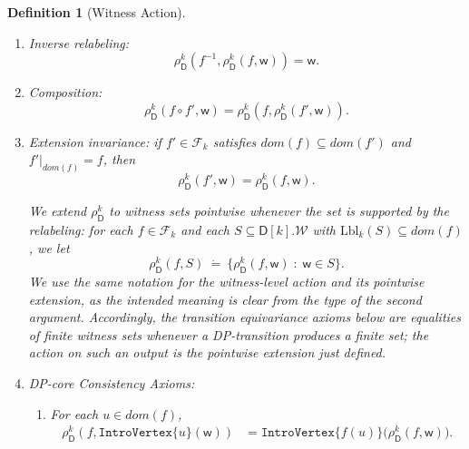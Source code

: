 \documentclass[11pt,a4paper]{article}
\newtheorem{definition}[theorem]{Definition}
\newcommand{\treewidthvalue}{k}
\newcommand{\introvertextype}[1]{\mathtt{IntroVertex}\{#1\}}
\newcommand{\defeq}{~\dot{=}~}
\newcommand{\vertexone}{u}
\newcommand{\allwitnesses}{\mathcal{W}}
\newcommand{\awitness}{\mathsf{w}}
\newcommand{\dpcore}{\mathsf{D}}
\newcommand{\witnessset}{S}
\newcommand{\domain}{dom}
\newcommand{\relabelingfunction}{f}
\newcommand{\relabelclass}{\mathcal{F}}
\newcommand{\action}{\rho}
\begin{document}
\begin{definition}[Witness Action]
\begin{enumerate}
\[	    \mathrm{Lbl}_{\treewidthvalue}(\action_{\dpcore}^{\treewidthvalue}(\relabelingfunction,\awitness))
	    = \relabelingfunction(\mathrm{Lbl}_{\treewidthvalue}(\awitness)).
	    \]
	    \item Inverse relabeling: \label{condition:relabeldpcore-condition-two} \[\action_{\dpcore}^{\treewidthvalue}(\relabelingfunction^{-1},\action_{\dpcore}^{\treewidthvalue}(\relabelingfunction,\awitness)) = \awitness.\]
	    \item Composition: \label{condition:relabeldpcore-condition-three} \[\action_{\dpcore}^{\treewidthvalue}(\relabelingfunction\circ \relabelingfunction',\awitness) =
	    \action_{\dpcore}^{\treewidthvalue}(\relabelingfunction,\action_{\dpcore}^{\treewidthvalue}(\relabelingfunction',\awitness)).\]
	    \item \label{condition:relabeldpcore-condition-extension-invariance}
	    Extension invariance:
	    if $\relabelingfunction'\in \relabelclass_{\treewidthvalue}$ satisfies $\domain(\relabelingfunction)\subseteq \domain(\relabelingfunction')$ and $\relabelingfunction'|_{\domain(\relabelingfunction)}=\relabelingfunction$, then
		    \[
		    \action_{\dpcore}^{\treewidthvalue}(\relabelingfunction',\awitness)=\action_{\dpcore}^{\treewidthvalue}(\relabelingfunction,\awitness).
		    \]

We extend $\action_{\dpcore}^{\treewidthvalue}$ to witness sets pointwise whenever the set is supported by the relabeling: for each $\relabelingfunction\in \relabelclass_{\treewidthvalue}$ and each $\witnessset\subseteq \dpcore[\treewidthvalue].\allwitnesses$ with $\mathrm{Lbl}_{\treewidthvalue}(\witnessset)\subseteq\domain(\relabelingfunction)$, we let
\[
	\action_{\dpcore}^{\treewidthvalue}(\relabelingfunction,\witnessset)\defeq
	\{\action_{\dpcore}^{\treewidthvalue}(\relabelingfunction,\awitness)\;:\; \awitness\in \witnessset\}.
	\]
	We use the same notation for the witness-level action and its pointwise extension, as the intended meaning is clear from the type of the second argument.
	Accordingly, the transition equivariance axioms below are equalities of finite witness sets whenever a DP-transition produces a finite set; the action on such an output is the pointwise extension just defined.

			    \item DP-core Consistency Axioms:
				    \begin{enumerate}
				    \item \label{condition:relabeldpcore-condition-four}
				    For each $\vertexone\in \domain(\relabelingfunction)$,
				    \[
				    \begin{aligned}
				    \action_{\dpcore}^{\treewidthvalue}(\relabelingfunction,\introvertextype{\vertexone}(\awitness))
				    &=
				    \introvertextype{\relabelingfunction(\vertexone)}\bigl(\action_{\dpcore}^{\treewidthvalue}(\relabelingfunction,\awitness)\bigr).
				    \end{aligned}
				    \]


\end{enumerate}
\end{enumerate}
\end{definition}
\end{document}
